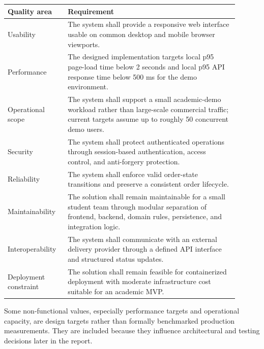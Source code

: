 \begingroup
\small
\setlength{\LTpre}{0.4em}
\setlength{\LTpost}{0.8em}
\label{tab:nonfunctional-requirements}
\begin{tabular}{L{0.22\linewidth} L{0.68\linewidth}}
\toprule
\textbf{Quality area} & \textbf{Requirement} \\
\midrule
Usability & The system shall provide a responsive web interface usable on common desktop and mobile browser viewports. \\
Performance & The designed implementation targets local p95 page-load time below 2 seconds and local p95 API response time below 500 ms for the demo environment. \\
Operational scope & The system shall support a small academic-demo workload rather than large-scale commercial traffic; current targets assume up to roughly 50 concurrent demo users. \\
Security & The system shall protect authenticated operations through session-based authentication, access control, and anti-forgery protection. \\
Reliability & The system shall enforce valid order-state transitions and preserve a consistent order lifecycle. \\
Maintainability & The solution shall remain maintainable for a small student team through modular separation of frontend, backend, domain rules, persistence, and integration logic. \\
Interoperability & The system shall communicate with an external delivery provider through a defined API interface and structured status updates. \\
Deployment constraint & The solution shall remain feasible for containerized deployment with moderate infrastructure cost suitable for an academic MVP. \\
\bottomrule
\end{tabular}
\endgroup

Some non-functional values, especially performance targets and operational capacity, are design targets rather than formally benchmarked production measurements. They are included because they influence architectural and testing decisions later in the report.
